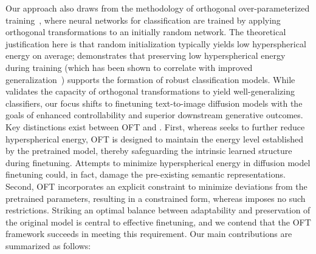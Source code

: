 Our approach also draws from the methodology of orthogonal over-parameterized training~\cite{liu2021orthogonal}, where neural networks for classification are trained by applying orthogonal transformations to an initially random network. The theoretical justification here is that random initialization typically yields low hyperspherical energy on average; \cite{liu2021orthogonal} demonstrates that preserving low hyperspherical energy during training (which has been shown to correlate with improved generalization~\cite{liu2018learning,lin2020regularizing}) supports the formation of robust classification models. While \cite{liu2021orthogonal} validates the capacity of orthogonal transformations to yield well-generalizing classifiers, our focus shifts to finetuning text-to-image diffusion models with the goals of enhanced controllability and superior downstream generative outcomes. Key distinctions exist between OFT and \cite{liu2021orthogonal}. First, whereas \cite{liu2021orthogonal} seeks to further reduce hyperspherical energy, OFT is designed to maintain the energy level established by the pretrained model, thereby safeguarding the intrinsic learned structure during finetuning. Attempts to minimize hyperspherical energy in diffusion model finetuning could, in fact, damage the pre-existing semantic representations. Second, OFT incorporates an explicit constraint to minimize deviations from the pretrained parameters, resulting in a constrained form, whereas \cite{liu2021orthogonal} imposes no such restrictions. Striking an optimal balance between adaptability and preservation of the original model is central to effective finetuning, and we contend that the OFT framework succeeds in meeting this requirement. Our main contributions are summarized as follows:

